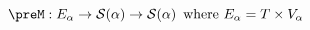 \documentclass[preview]{standalone}
\begin{document}
\begin{equation*}
  \preM : E_\alpha \rightarrow \mathcal{S}(\alpha) \rightarrow \mathcal{S}(\alpha) \,
  \text{ where } E_\alpha = T \times V_\alpha
\end{equation*}
\end{document}
